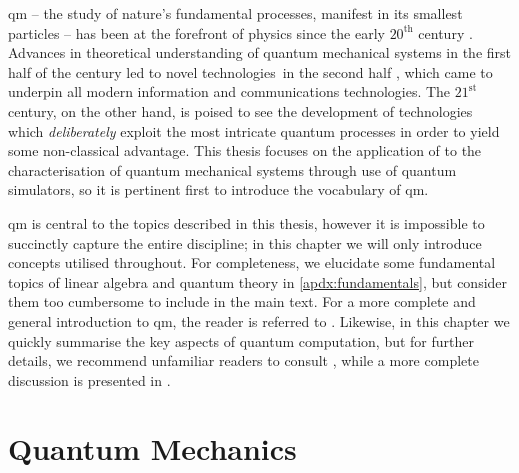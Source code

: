\Gls{qm} -- the study of nature's fundamental processes, manifest in its smallest particles --
    has been at the forefront of physics since the early $20^{\textrm{th}}$ century \cite{jammer1966conceptual}.
Advances in theoretical understanding of quantum mechanical systems in the first half of the century 
    \cite{born1926quantenmechanik, heisenberg1985quantentheoretische}
    led to novel technologies\footnotemark \ in the second half \cite{brinkman1997history},
    which came to underpin all modern information and communications technologies.
The $21^{\textrm{st}}$ century, on the other hand, is poised to see the development of 
    technologies which \emph{deliberately} exploit the most intricate quantum processes in order to yield 
    some non-classical advantage. 
This thesis focuses on the application of  to the characterisation of quantum mechanical systems
    through use of quantum simulators, 
    so it is pertinent first to introduce the vocabulary of \gls{qm}. 
\par 

\Gls{qm} is central to the topics described in this thesis, 
    however it is impossible to succinctly capture the entire discipline; 
    in this chapter we will only introduce concepts utilised throughout.
For completeness, we elucidate some fundamental topics of linear algebra and quantum theory in \cref{apdx:fundamentals},
    but consider them too cumbersome to include in the main text. 
For a more complete and general introduction to \gls{qm}, the reader is referred to \cite{griffiths2018introduction, susskind2014quantum}.
Likewise, in this chapter we quickly summarise the key aspects of quantum computation, 
    but for further details, we recommend unfamiliar readers to consult \cite{rieffel2011quantum}, 
    while a more complete discussion is presented in \cite{nielsen2002quantum}.

\section{Quantum Mechanics}\label{sec:qm}

